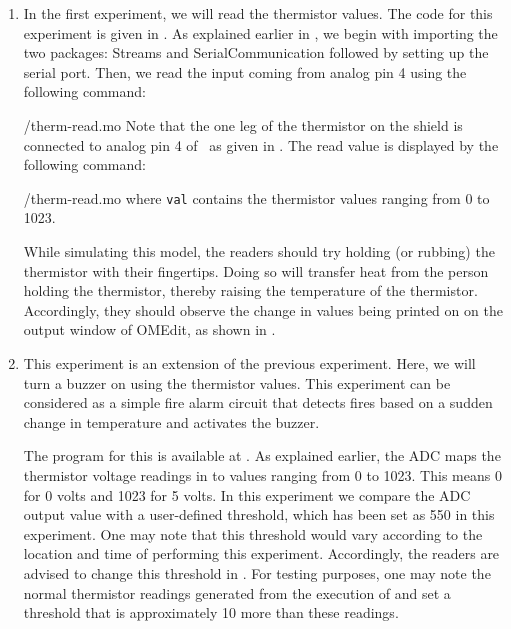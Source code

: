 \begin{enumerate}
  \item In the first experiment, we will read the thermistor values. The code for this experiment is given in
        . As explained earlier in ,
        we begin with importing the two packages: Streams and SerialCommunication followed
        by setting up the serial port. Then, we read the input coming from analog pin 4 using the
        following command:
        
        {\LocTHERMOpenModelicacode/therm-read.mo} Note that the one leg of the thermistor on
        the shield is connected to analog pin 4 of \arduino\,
        as given in . The read value is displayed
        by the following command:
        
        {\LocTHERMOpenModelicacode/therm-read.mo} where {\tt val} contains
        the thermistor values ranging from 0 to 1023.

        While simulating this model,
        the readers should try holding (or rubbing) the thermistor with their fingertips.
        Doing so will transfer heat from the person holding the
        thermistor, thereby raising the temperature of the thermistor.
        Accordingly, they should observe the change in values being printed on on the output window of OMEdit, as shown in .

  \item This experiment is an extension of the previous experiment. Here,
        we will turn a buzzer on using the thermistor values. This experiment
        can be considered as a simple fire alarm circuit that
        detects fires based on a sudden change in temperature and
        activates the buzzer.

        The program for this is available at
        .  As explained earlier,
        the ADC maps the thermistor voltage readings in to values
        ranging from 0 to 1023. This means 0 for 0 volts and 1023 for 5
        volts. In this experiment we compare the ADC output value with a user-defined
        threshold, which has been set as 550 in this experiment. One may note that
        this threshold would vary according to the location and time of performing
        this experiment. Accordingly, the readers are advised to change this threshold
        in . For testing purposes, one may note the
        normal thermistor readings generated from the execution of 
        and set a threshold that is approximately 10 more than these readings.


\end{enumerate}
